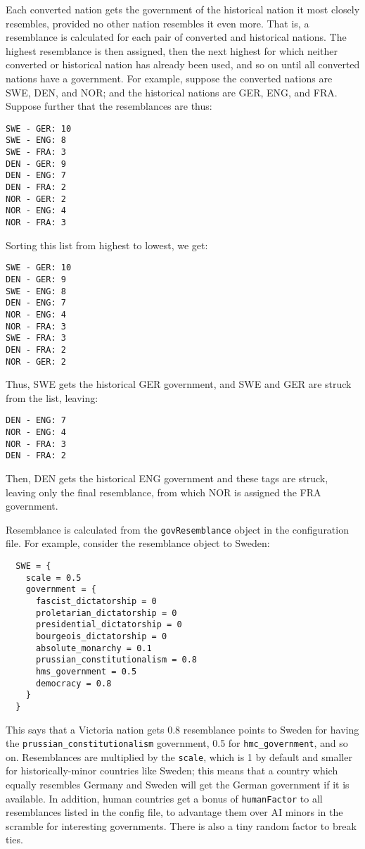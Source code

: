\documentclass[12pt,ebook,oneside]{book}
\begin{document}
Each converted nation gets the government of the historical nation it
most closely resembles, provided no other nation resembles it even
more. That is, a resemblance is calculated for each pair of converted
and historical nations. The highest resemblance is then assigned, then
the next highest for which neither converted or historical nation has
already been used, and so on until all converted nations have a
government. For example, suppose the converted nations are SWE, DEN,
and NOR; and the historical nations are GER, ENG, and FRA. Suppose
further that the resemblances are thus:
\begin{verbatim}
SWE - GER: 10
SWE - ENG: 8
SWE - FRA: 3
DEN - GER: 9
DEN - ENG: 7
DEN - FRA: 2
NOR - GER: 2
NOR - ENG: 4
NOR - FRA: 3
\end{verbatim}
Sorting this list from highest to lowest, we get:
\begin{verbatim}
SWE - GER: 10
DEN - GER: 9
SWE - ENG: 8
DEN - ENG: 7
NOR - ENG: 4
NOR - FRA: 3
SWE - FRA: 3
DEN - FRA: 2
NOR - GER: 2
\end{verbatim}
Thus, SWE gets the historical GER government, and SWE and GER are
struck from the list, leaving:
\begin{verbatim}
DEN - ENG: 7
NOR - ENG: 4
NOR - FRA: 3
DEN - FRA: 2
\end{verbatim}
Then, DEN gets the historical ENG government and these tags are
struck, leaving only the final resemblance, from which NOR is assigned
the FRA government. 

Resemblance is calculated from the \texttt{govResemblance} object in
the configuration file. For example, consider the resemblance object
to Sweden:
\begin{verbatim}
  SWE = {
    scale = 0.5
    government = {
      fascist_dictatorship = 0
      proletarian_dictatorship = 0 
      presidential_dictatorship = 0
      bourgeois_dictatorship = 0
      absolute_monarchy = 0.1
      prussian_constitutionalism = 0.8
      hms_government = 0.5
      democracy = 0.8
    }
  }
\end{verbatim}
This says that a Victoria nation gets 0.8 resemblance points to Sweden for
having the \texttt{prussian\_constitutionalism} government, 0.5 for
\texttt{hmc\_government}, and so on. Resemblances are multiplied by
the \texttt{scale}, which is 1 by default and smaller for
historically-minor countries like Sweden; this means that a country
which equally resembles Germany and Sweden will get the German
government if it is available. In addition, human countries get a
bonus of \texttt{humanFactor} to all resemblances listed in the config
file, to advantage them
over AI minors in the scramble for interesting governments. There is
also a tiny random factor to break ties. 
\end{document}
